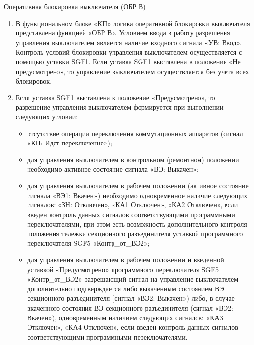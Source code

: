 \begin{enumerate}
{\begin{enumerate}
\end{enumerate}

\item Оперативная блокировка выключателя (ОБР В)

\begin{enumerate}

\item
В функциональном блоке «КП» логика оперативной блокировки выключателя представлена функцией «ОБР В». Условием ввода в работу разрешения управления выключателем является наличие входного сигнала «УВ: Ввод». Контроль условий блокировки управления выключателем осуществляется с помощью уставки SGF1. Если уставка SGF1 выставлена в положение «Не предусмотрено», то управление выключателем осуществляется без учета всех блокировок.

\item
Если уставка SGF1 выставлена в положение «Предусмотрено», то разрешение управления выключателем формируется при выполнении следующих условий:
\begin{itemize}
	\item отсутствие операции переключения коммутационных аппаратов (сигнал «КП: Идет переключение»);
	\item для управления выключателем в контрольном (ремонтном) положении необходимо активное состояние сигнала «ВЭ: Выкачен»;
	\item для управления выключателем в рабочем положении (активное состояние сигнала «ВЭ1: Вкачен») необходимо одновременное наличие следующих сигналов: «ЗН: Отключен», «КА1 Отключен», «КА2 Отключен», если введен контроль данных сигналов соответствующими программными переключателями, при этом есть возможность дополнительного контроля положения тележки секционного разъединителя уставкой программного переключателя SGF5 «Контр\_от\_ВЭ2»;
	\item для управления выключателем в рабочем положении и введенной уставкой «Предусмотрено» программного переключателя SGF5 «Контр\_от\_ВЭ2» разрешающий сигнал на управление выключателем дополнительно подтверждается либо выкаченным состоянием ВЭ секционного разъединителя (сигнал «ВЭ2: Выкачен») либо, в случае вкаченного состояния ВЭ секционного разъединителя (сигнал «ВЭ2: Вкачен»), одновременным наличием следующих сигналов: «КА3 Отключен», «КА4 Отключен», если введен контроль данных сигналов соответствующими программными переключателями.
\end{itemize}


\end{enumerate}}
\end{enumerate}
